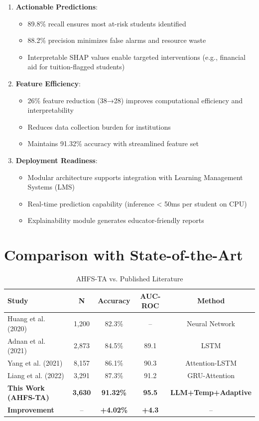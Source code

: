 \begin{enumerate}
\item \textbf{Actionable Predictions}:
\begin{itemize}
\item 89.8\% recall ensures most at-risk students identified
\item 88.2\% precision minimizes false alarms and resource waste
\item Interpretable SHAP values enable targeted interventions (e.g., financial aid for tuition-flagged students)
\end{itemize}

\item \textbf{Feature Efficiency}:
\begin{itemize}
\item 26\% feature reduction (38→28) improves computational efficiency and interpretability
\item Reduces data collection burden for institutions
\item Maintains 91.32\% accuracy with streamlined feature set
\end{itemize}

\item \textbf{Deployment Readiness}:
\begin{itemize}
\item Modular architecture supports integration with Learning Management Systems (LMS)
\item Real-time prediction capability (inference < 50ms per student on CPU)
\item Explainability module generates educator-friendly reports
\end{itemize}
\end{enumerate}

\section{Comparison with State-of-the-Art}

\begin{table}[h]
\centering
\caption{AHFS-TA vs. Published Literature}
\label{tab:sota_comparison}
\begin{tabular}{lcccc}
\hline
\textbf{Study} & \textbf{N} & \textbf{Accuracy} & \textbf{AUC-ROC} & \textbf{Method} \\
\hline
Huang et al. (2020) & 1,200 & 82.3\% & -- & Neural Network \\
Adnan et al. (2021) & 2,873 & 84.5\% & 89.1 & LSTM \\
Yang et al. (2021) & 8,157 & 86.1\% & 90.3 & Attention-LSTM \\
Liang et al. (2022) & 3,291 & 87.3\% & 91.2 & GRU-Attention \\
\hline
\textbf{This Work (AHFS-TA)} & \textbf{3,630} & \textbf{91.32\%} & \textbf{95.5} & \textbf{LLM+Temp+Adaptive} \\
\hline
\textbf{Improvement} & -- & \textbf{+4.02\%} & \textbf{+4.3} & -- \\
\hline
\end{tabular}
\end{table}

